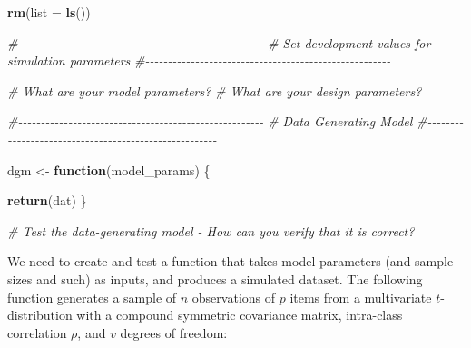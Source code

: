 \documentclass[
]{book}
\newenvironment{Shaded}{\begin{snugshade}}{\end{snugshade}}
\newcommand{\AttributeTok}[1]{\textcolor[rgb]{0.13,0.29,0.53}{#1}}
\newcommand{\CommentTok}[1]{\textcolor[rgb]{0.56,0.35,0.01}{\textit{#1}}}
\newcommand{\ControlFlowTok}[1]{\textcolor[rgb]{0.13,0.29,0.53}{\textbf{#1}}}
\newcommand{\FunctionTok}[1]{\textcolor[rgb]{0.13,0.29,0.53}{\textbf{#1}}}
\newcommand{\NormalTok}[1]{#1}
\newcommand{\OtherTok}[1]{\textcolor[rgb]{0.56,0.35,0.01}{#1}}
\begin{document}
\begin{Shaded}
\begin{Highlighting}[]
\FunctionTok{rm}\NormalTok{(}\AttributeTok{list =} \FunctionTok{ls}\NormalTok{())}

\CommentTok{\#{-}{-}{-}{-}{-}{-}{-}{-}{-}{-}{-}{-}{-}{-}{-}{-}{-}{-}{-}{-}{-}{-}{-}{-}{-}{-}{-}{-}{-}{-}{-}{-}{-}{-}{-}{-}{-}{-}{-}{-}{-}{-}{-}{-}{-}{-}{-}{-}{-}{-}{-}{-}{-}{-}}
\CommentTok{\# Set development values for simulation parameters}
\CommentTok{\#{-}{-}{-}{-}{-}{-}{-}{-}{-}{-}{-}{-}{-}{-}{-}{-}{-}{-}{-}{-}{-}{-}{-}{-}{-}{-}{-}{-}{-}{-}{-}{-}{-}{-}{-}{-}{-}{-}{-}{-}{-}{-}{-}{-}{-}{-}{-}{-}{-}{-}{-}{-}{-}{-}}

\CommentTok{\# What are your model parameters?}
\CommentTok{\# What are your design parameters?}

\CommentTok{\#{-}{-}{-}{-}{-}{-}{-}{-}{-}{-}{-}{-}{-}{-}{-}{-}{-}{-}{-}{-}{-}{-}{-}{-}{-}{-}{-}{-}{-}{-}{-}{-}{-}{-}{-}{-}{-}{-}{-}{-}{-}{-}{-}{-}{-}{-}{-}{-}{-}{-}{-}{-}{-}{-}}
\CommentTok{\# Data Generating Model}
\CommentTok{\#{-}{-}{-}{-}{-}{-}{-}{-}{-}{-}{-}{-}{-}{-}{-}{-}{-}{-}{-}{-}{-}{-}{-}{-}{-}{-}{-}{-}{-}{-}{-}{-}{-}{-}{-}{-}{-}{-}{-}{-}{-}{-}{-}{-}{-}{-}{-}{-}{-}{-}{-}{-}{-}{-}}

\NormalTok{dgm }\OtherTok{\textless{}{-}} \ControlFlowTok{function}\NormalTok{(model\_params) \{}

  \FunctionTok{return}\NormalTok{(dat)}
\NormalTok{\}}

\CommentTok{\# Test the data{-}generating model {-} How can you verify that it is correct?}
\end{Highlighting}
\end{Shaded}

We need to create and test a function that takes model parameters (and sample sizes and such) as inputs, and produces a simulated dataset.
The following function generates a sample of \(n\) observations of \(p\) items from a multivariate \(t\)-distribution with a compound symmetric covariance matrix, intra-class correlation \(\rho\), and \(v\) degrees of freedom:
\end{document}
